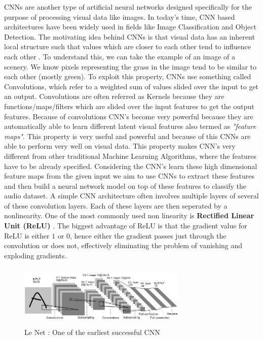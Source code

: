 \documentclass[letterpaper, 10 pt, conference]{ieeeconf}  %
\begin{document}
CNNs are another type of artificial neural networks designed specifically for the purpose of processing visual data like images. In today's time, CNN based architectures have been widely used in fields like Image Classification \cite{ilsvrc} and Object Detection. The motivating idea behind CNNs is that visual data has an inherent local structure such that values which are closer to each other tend to influence each other \cite{imagenet_original}. To understand this, we can take the example of an image of a scenery. We know pixels representing the grass in the image tend to be similar to each other (mostly green). To exploit this property, CNNs use something called Convolutions, which refer to a weighted sum of values slided over the input to get an output. Convolutions are often referred as Kernels because they are functions/maps/filters which are slided over the input features to get the output features. Because of convolutions CNN's become very powerful because they are automatically able to learn different latent visual features also termed as \textit{"feature maps"}. This property is very useful and powerful and because of this CNNs are able to perform very well on visual data. This property makes CNN's very different from other traditional Machine Learning Algorithms, where the features have to be already specified. Considering the CNN's learn these high dimensional feature maps from the given input we aim to use CNNs to extract these features and then build a neural network model on top of these features to classify the audio dataset. A simple CNN architecture often involves multiple layers of several of these convolution layers. Each of these layers are then seperated by a nonlinearity. One of the most commonly used non linearity is \textbf{Rectified Linear Unit (ReLU)} \cite{imagenet_original}. The biggest advantage of ReLU is that the gradient value for ReLU is either $1$ or $0$, hence either the gradient passes just through the convolution or does not, effectively eliminating the problem of vanishing and exploding gradients.

\begin{figure}[!h]
\centering
\includegraphics[width=8cm,height=3cm]{../figs/cnn/le_net.png}	
\caption{Le Net \cite{le_net}: One of the earliest successful CNN}
\label{fig:Le_Net_Arch} 
\end{figure}
\end{document}
